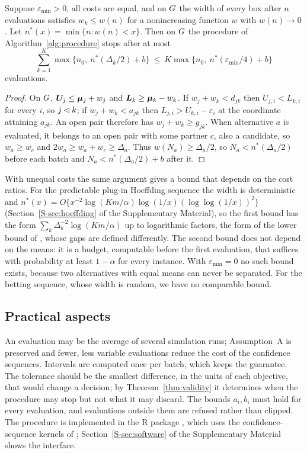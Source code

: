 \begin{theorem}\label{thm:termination}
Suppose $\varepsilon_{\min}>0$, all costs are equal, and on $G$ the width of every box after $n$ evaluations satisfies $w_k\le w(n)$ for a nonincreasing function $w$ with $w(n)\to0$. Let $n^*(x)=\min\{n:w(n)<x\}$. Then on $G$ the procedure of Algorithm~\ref{alg:procedure} stops after at most
\[
\sum_{k=1}^K\max\{n_0,\ n^*(\Delta_k/2)+b\}\ \le\ K\max\{n_0,\ n^*(\varepsilon_{\min}/4)+b\}
\]
evaluations.
\end{theorem}

\begin{proof}
On $G$, $\bm{U}_j\le\bm{\mu}_j+w_j$ and $\bm{L}_k\ge\bm{\mu}_k-w_k$. If $w_j+w_k<d_{jk}$ then $U_{j,i}<L_{k,i}$ for every $i$, so $j\lhd k$; if $w_j+w_k<a_{jk}$ then $L_{j,i}>U_{k,i}-\varepsilon_i$ at the coordinate attaining $a_{jk}$. An open pair therefore has $w_j+w_k\ge g_{jk}$. When alternative $a$ is evaluated, it belongs to an open pair with some partner $c$, also a candidate, so $w_a\ge w_c$ and $2w_a\ge w_a+w_c\ge\Delta_a$. Thus $w(N_a)\ge\Delta_a/2$, so $N_a<n^*(\Delta_a/2)$ before each batch and $N_a<n^*(\Delta_a/2)+b$ after it.
\end{proof}

With unequal costs the same argument gives a bound that depends on the cost ratios. For the predictable plug-in Hoeffding sequence the width is deterministic and $n^*(x)=O\{x^{-2}\log(Km/\alpha)\log(1/x)(\log\log(1/x))^{2}\}$ (Section~\ref{S-sec:hoeffding} of the Supplementary Material), so the first bound has the form $\sum_k\Delta_k^{-2}\log(Km/\alpha)$ up to logarithmic factors, the form of the lower bound of \citet{auer2016}, whose gaps are defined differently. The second bound does not depend on the means: it is a budget, computable before the first evaluation, that suffices with probability at least $1-\alpha$ for every instance. With $\varepsilon_{\min}=0$ no such bound exists, because two alternatives with equal means can never be separated. For the betting sequence, whose width is random, we have no comparable bound.

\subsection{Practical aspects}\label{sec:practical}

An evaluation may be the average of several simulation runs; Assumption~A is preserved and fewer, less variable evaluations reduce the cost of the confidence sequences. Intervals are computed once per batch, which keeps the guarantee. The tolerance should be the smallest difference, in the units of each objective, that would change a decision; by Theorem~\ref{thm:validity} it determines when the procedure may stop but not what it may discard. The bounds $a_i,b_i$ must hold for every evaluation, and evaluations outside them are refused rather than clipped. The procedure is implemented in the R package  \citep{paretoinfer}, which uses the confidence-sequence kernels of  \citep{seqbench}; Section~\ref{S-sec:software} of the Supplementary Material shows the interface.
